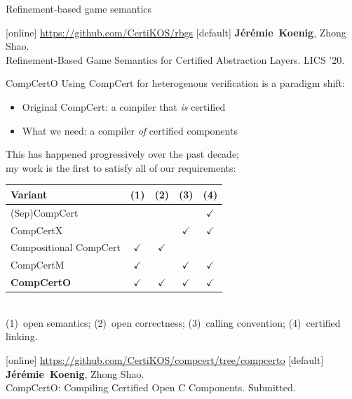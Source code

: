 \documentclass[aspectratio=141]{beamer}
\newcommand{\fme}{\textbf{J\'er\'emie~Koenig}}
\begin{document}
\begin{frame}{Refinement-based game semantics} %
  \vfill
  \begin{thebibliography}{10}
    [online]
      \url{https://github.com/CertiKOS/rbgs}
    [default]
      \fme, Zhong Shao.
      \newblock \\
      Refinement-Based Game Semantics for Certified Abstraction Layers.
      \newblock
      LICS '20.
  \end{thebibliography}
\end{frame}

\begin{frame}{CompCertO} %
  Using CompCert for heterogenous verification
  is a paradigm shift:
  \begin{itemize}
    \item Original CompCert: a compiler that \emph{is} certified
    \item What we need: a compiler \emph{of} certified components
  \end{itemize}
  This has happened progressively over the past decade; \\
  my work is the first to satisfy all of our requirements:
  \begin{center}
    \small
    \begin{tabular}{l@{\qquad}cccc}
      \hline
      Variant & (1) & (2) & (3) & (4) \\
      \hline
      (Sep)CompCert &
        & & & $\checkmark$ \\
      CompCertX &
        & & $\checkmark$ & $\checkmark$ \\
      Compositional CompCert &
        $\checkmark$ & $\checkmark$ & & \\
      CompCertM &
        $\checkmark$ & & $\checkmark$ & $\checkmark$ \\
      \bf CompCertO &
        $\checkmark$&$\checkmark$&$\checkmark$&$\checkmark$ \\
      \hline
    \end{tabular}
    \\ \tiny
    (1)~open semantics;
    (2)~open correctness;
    (3)~calling convention;
    (4)~certified linking.
  \end{center}

  \begin{thebibliography}{10}
    [online]
      \url{https://github.com/CertiKOS/compcert/tree/compcerto}
    [default]
      \fme, Zhong Shao.
      \newblock \\
      CompCertO: Compiling Certified Open C Components.
      \newblock
      Submitted.
  \end{thebibliography}
\end{frame}
\end{document}
